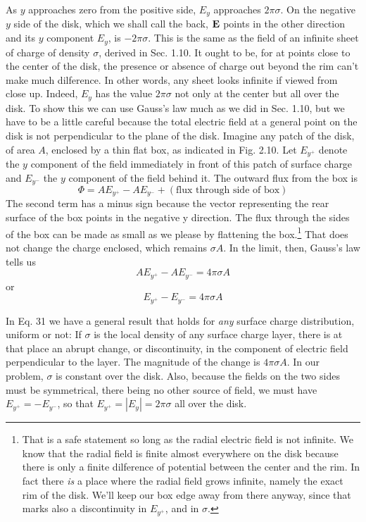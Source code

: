 As $y$ approaches zero from the positive side, $E_y$ approaches $2\pi\sigma$.
On the negative $y$ side of the disk, which we shall call the back, $\mathbf{E}$
points in the other direction and its $y$ component $E_y$, is $-2\pi\sigma$. This
is the same as the field of an infinite sheet of charge of density $\sigma$,
derived in Sec. 1.10. It ought to be, for at points close to the center
of the disk, the presence or absence of charge out beyond the rim
can't make much dilference. In other words, any sheet looks infinite
if viewed from close up. Indeed, $E_y$ has the value $2\pi\sigma$ not only at the
center but all over the disk. To show this we can use Gauss's law
much as we did in Sec. 1.10, but we have to be a little careful because
the total electric field at a general point on the disk is not perpendicular
to the plane of the disk. Imagine any patch of the disk, of
area $A$, enclosed by a thin flat box, as indicated in Fig. 2.10. Let $E_{y^+}$
denote the $y$ component of the field immediately in front of this patch
of surface charge and $E_{y^-}$ the $y$ component of the field behind it. The
outward flux from the box is
\begin{equation}
  \Phi = AE_{y^+}-AE_{y^-} + (\text{flux through side of box})
\end{equation}
The second term has a minus sign because the vector representing the
rear surface of the box points in the negative y direction. The flux
through the sides of the box can be made as small as we please by
flattening the box.\footnote{That is a safe statement
so long as the radial electric field is not infinite. We know
that the radial field is finite almost everywhere on the disk because there is only a finite
dilference of potential between the center and the rim. In fact there \emph{is} a place where
the radial field grows infinite, namely the exact rim of the disk. We'll keep our box
edge away from there anyway, since that marks also a discontinuity in $E_{y^+}$, and in $\sigma$.}
That does not change the charge enclosed, which
remains $\sigma A$. In the limit, then, Gauss's law tells us
\begin{equation}
  AE_{y^+}-AE_{y^-} = 4\pi\sigma A
\end{equation}
or
\begin{equation}
  E_{y^+}-E_{y^-} = 4\pi\sigma A
\end{equation}

In Eq. 31 we have a general result that holds for \emph{any} surface charge
distribution, uniform or not: If $\sigma$ is the local density of any surface
charge layer, there is at that place an abrupt change, or discontinuity,
in the component of electric field perpendicular to the layer. The
magnitude of the change is $4\pi\sigma A$. In our problem, $\sigma$ is constant over
the disk. Also, because the fields on the two sides must be
symmetrical, there being no other source of field, we must have
$E_{y^+}=-E_{y^-}$, so that $E_{y^+}= |E_y| = 2\pi\sigma$ all over the disk.


